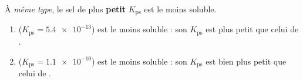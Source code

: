 \documentclass[11pt,a4paper]{article}
\begin{document}
\begin{corrige}
À \emph{même type}, le sel de plus \textbf{petit} $K_{\mathrm{ps}}$ est le moins soluble.
\begin{enumerate}[label=\alph*)]
  \item {} ($K_{\mathrm{ps}}=\num{5.4e-13}$) est le moins soluble : son $K_{\mathrm{ps}}$ est
        plus petit que celui de .
  \item {} ($K_{\mathrm{ps}}=\num{1.1e-10}$) est le moins soluble : son $K_{\mathrm{ps}}$ est
        bien plus petit que celui de .
\end{enumerate}
\end{corrige}
\end{document}
